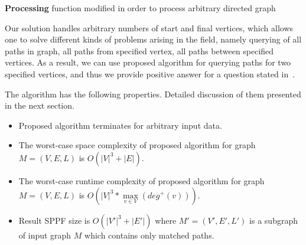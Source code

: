 \begin{algorithm}[ht]
\begin{algorithmic}[1]
\caption{\textbf{Processing} function modified in order to process arbitrary directed graph}
\label{modifAlgo}
       \boldnext
       \Else 
       \EndIf
       \EndIf
       \EndFor
  \EndCase
       \boldnext
       \EndFor
  \EndCase
  \EndCase
  \Case{$\_$}
  \EndCase
  \EndSwitch
\EndFunction

\end{algorithmic}
\end{algorithm}

Our solution handles arbitrary numbers of start and final vertices, which allows one to solve different kinds of problems arising in the field, namely querying of all paths in graph, all paths from specified vertex, all paths between specified vertices. As a result, we can use proposed algorithm for querying paths for two specified vertices, and thus we provide positive answer for a question stated in~\cite{Hellings16}. 

The algorithm has the following properties. Detailed discussion of them presented in the next section.
\begin{itemize} 
\item Proposed algorithm terminates for arbitrary input data.
\item The worst-case space complexity of proposed algorithm for graph $M=(V,E,L)$ is $O(|V|^3 + |E|)$.
\item The worst-case runtime complexity of proposed algorithm for graph $M=(V,E,L)$ is $O\left(|V|^3*\max\limits_{v \in V}\left(deg^+\left(v\right)\right)\right).$
\item Result SPPF size is $O(|V'|^3 + |E'|)$ where $M'=(V',E',L')$ is a subgraph of input graph $M$ which contains only matched paths.
\end{itemize}
